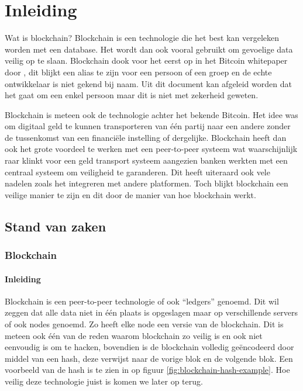 
\chapter{Inleiding}
\label{ch:inleiding}

Wat is blockchain? Blockchain is een technologie die het best kan vergeleken worden met een database. Het wordt dan ook vooral gebruikt om gevoelige data veilig op te slaan. Blockchain dook voor het eerst op in het Bitcoin whitepaper door \textcite{Nakamoto2008}, dit blijkt een alias te zijn voor een persoon of een groep en de echte ontwikkelaar is niet gekend bij naam. Uit dit document kan afgeleid worden dat het gaat om een enkel persoon maar dit is niet met zekerheid geweten.

Blockchain is meteen ook de technologie achter het bekende Bitcoin. Het idee was om digitaal geld te kunnen transporteren van één partij naar een andere zonder de tussenkomst van een financiële instelling of dergelijke. Blockchain heeft dan ook het grote voordeel te werken met een peer-to-peer systeem wat waarschijnlijk raar klinkt voor een geld transport systeem aangezien banken werkten met een centraal systeem om veiligheid te garanderen. Dit heeft uiteraard ook vele nadelen zoals het integreren met andere platformen. Toch blijkt blockchain een veilige manier te zijn en dit door de manier van hoe blockchain werkt.

\section{Stand van zaken}
\label{sec:stand-van-zaken}


\subsection{Blockchain}
\subsubsection{Inleiding}
 Blockchain is een peer-to-peer technologie of ook ``ledgers'' genoemd. Dit wil zeggen dat alle data niet in één plaats is opgeslagen maar op verschillende servers of ook nodes genoemd. Zo heeft elke node een versie van de blockchain. Dit is meteen ook één van de reden waarom blockchain zo veilig is en ook niet eenvoudig is om te hacken, bovendien is de blockchain volledig geëncodeerd door middel van een hash, deze verwijst naar de vorige blok en de volgende blok. Een voorbeeld van de hash is te zien in op figuur \ref{fig:blockchain-hash-example}. Hoe veilig deze technologie juist is komen we later op terug.
 
